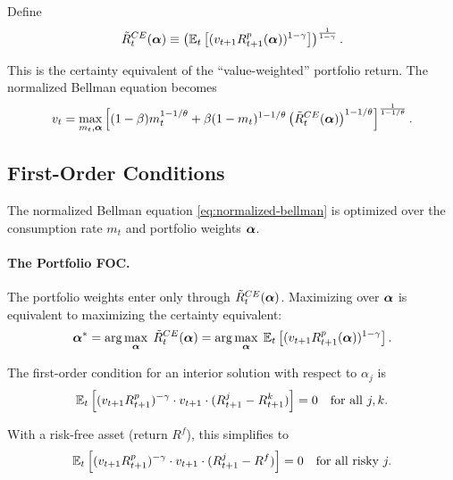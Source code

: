 Define
\begin{equation}
\tilde{R}_t^{CE}(\boldsymbol{\alpha}) \equiv \left( \mathbb{E}_t\left[ (v_{t+1} R_{t+1}^p(\boldsymbol{\alpha}))^{1-\gamma} \right] \right)^{\frac{1}{1-\gamma}}.
\label{eq:ce-return-normalized}
\end{equation}

This is the certainty equivalent of the ``value-weighted'' portfolio return. The normalized Bellman equation becomes
\begin{equation}
v_t = \max_{m_t, \boldsymbol{\alpha}} \left[ (1-\beta) m_t^{1-1/\theta} + \beta (1-m_t)^{1-1/\theta} \left( \tilde{R}_t^{CE}(\boldsymbol{\alpha}) \right)^{1-1/\theta} \right]^{\frac{1}{1-1/\theta}}.
\label{eq:bellman-with-ce}
\end{equation}

\subsection{First-Order Conditions}
\label{subsec:foc}

The normalized Bellman equation \eqref{eq:normalized-bellman} is optimized over the consumption rate $m_t$ and portfolio weights $\boldsymbol{\alpha}$.

\paragraph{The Portfolio FOC.}

The portfolio weights enter only through $\tilde{R}_t^{CE}(\boldsymbol{\alpha})$. Maximizing over $\boldsymbol{\alpha}$ is equivalent to maximizing the certainty equivalent:
\begin{equation}
\boldsymbol{\alpha}^{*} = \arg\max_{\boldsymbol{\alpha}} \; \tilde{R}_t^{CE}(\boldsymbol{\alpha}) = \arg\max_{\boldsymbol{\alpha}} \; \mathbb{E}_t\left[ (v_{t+1} R_{t+1}^p(\boldsymbol{\alpha}))^{1-\gamma} \right].
\label{eq:portfolio-foc-max}
\end{equation}

The first-order condition for an interior solution with respect to $\alpha_j$ is
\begin{equation}
\mathbb{E}_t\left[ (v_{t+1} R_{t+1}^p)^{-\gamma} \cdot v_{t+1} \cdot (R_{t+1}^j - R_{t+1}^k) \right] = 0 \quad \text{for all } j, k.
\label{eq:portfolio-foc}
\end{equation}

With a risk-free asset (return $R^f$), this simplifies to
\begin{equation}
\mathbb{E}_t\left[ (v_{t+1} R_{t+1}^p)^{-\gamma} \cdot v_{t+1} \cdot (R_{t+1}^j - R^f) \right] = 0 \quad \text{for all risky } j.
\label{eq:portfolio-foc-riskfree}
\end{equation}

